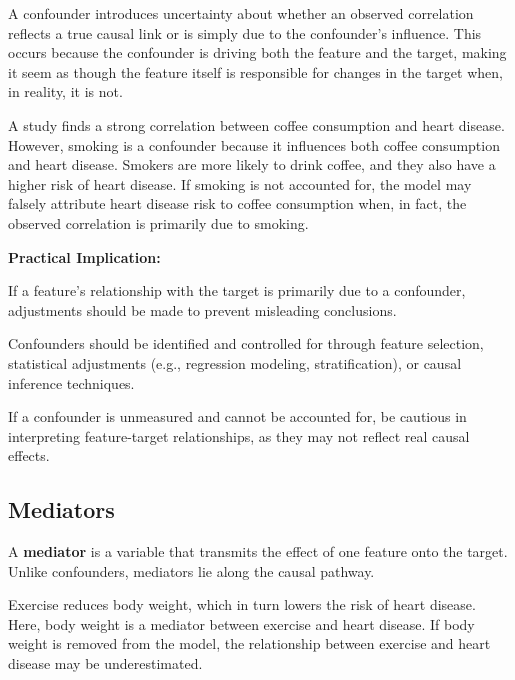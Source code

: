 \documentclass[12pt,openany]{book}
\begin{document}
A confounder introduces uncertainty about whether an observed correlation reflects a true causal link or is simply due to the confounder’s influence. This occurs because the confounder is driving both the feature and the target, making it seem as though the feature itself is responsible for changes in the target when, in reality, it is not.

\begin{examplebox}
A study finds a strong correlation between coffee consumption and heart disease. However, smoking is a confounder because it influences both coffee consumption and heart disease. Smokers are more likely to drink coffee, and they also have a higher risk of heart disease. If smoking is not accounted for, the model may falsely attribute heart disease risk to coffee consumption when, in fact, the observed correlation is primarily due to smoking.
\end{examplebox}

\textbf{Practical Implication:}

If a feature’s relationship with the target is primarily due to a confounder, adjustments should be made to prevent misleading conclusions.
\newline

Confounders should be identified and controlled for through feature selection, statistical adjustments (e.g., regression modeling, stratification), or causal inference techniques.
\newline

If a confounder is unmeasured and cannot be accounted for, be cautious in interpreting feature-target relationships, as they may not reflect real causal effects.

\subsection{Mediators}

A \textbf{mediator} is a variable that transmits the effect of one feature onto the target. Unlike confounders, mediators lie along the causal pathway.

\begin{examplebox}
Exercise reduces body weight, which in turn lowers the risk of heart disease. Here, body weight is a mediator between exercise and heart disease. If body weight is removed from the model, the relationship between exercise and heart disease may be underestimated.
\end{examplebox}
\end{document}
